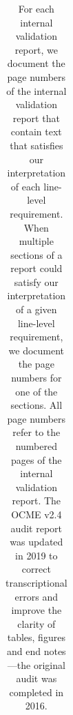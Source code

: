 \begin{table}[h]
\begin{tabular}{|  l  |l  |l|l  |l|l  |}
 
\end{tabular}
\caption{For each internal validation report, we document the page numbers of the internal validation report that contain text that satisfies our interpretation of each line-level requirement. When multiple sections of a report could satisfy our interpretation of a given line-level requirement, we document the page numbers for one of the sections. All page numbers refer to the numbered pages of the internal validation report. The OCME v2.4 audit report was updated in 2019 to correct transcriptional errors and improve the clarity of tables, figures and end notes---the original audit was completed in 2016.}
\label{appendix-table-compliance}
\end{table}